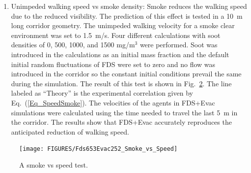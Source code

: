 \documentclass[12pt,a4paper,final,twoside]{stylevk}
\begin{document}
\begin{enumerate}
  geometry with no fire source and one agent in the middle of the room
  is used.  The agent is fixed at its initial position by setting the
  detection time large and by setting random noise of the movement
  equations to zero.  FDS point measurements of the gas concentrations
  and FED are placed at the position of the agent.  The room is
  initialized with different CO, CO${}_2$, and 0${}_2$ concentrations
  to test the overall FED calculation and each different component
  separately also.  The concentrations for the four different
  calculations were: (2, 0.1, 15)~\%, (0, 0, 12)~\% (0, 0.1, 21)~\%,
  and (3.43, 0.1, 21)~\% for the (CO${}_2$, CO, O${}_2$) volume
  fractions.  The room stays at the specified initial conditions,
  because there is nothing to generate a flow and also the initial
  random noise of FDS flow calculation is switched off.  The FDS+Evac
  output for the FED index of the agent is compared to a value
  computed using an external worksheet and the FDS point measurements
  for gas concentrations and for the FED index.  The results of the
  comparison are shown in Fig.~\ref{Fig_FED_Test}.  The results
  indicate that the FED calculation in FDS+Evac is implemented
  correctly (and that the ``FED'' point measurement output is also
  implemented correctly).
%
\begin{figure}[!tb]
  \centerline{\texttt{[image: FIGURES/Test\_Fds653Evac252\_FED]}} 
  \caption{A FED test.}\label{Fig_FED_Test}
\end{figure}
%
\item Unimpeded walking speed vs smoke density: Smoke reduces the
  walking speed due to the reduced visibility.  The prediction of this
  effect is tested in a 10~m long corridor geometry.  The unimpeded
  walking velocity for a smoke clear environment was set to 1.5~m/s.
  Four different calculations with soot densities of 0, 500, 1000, and
  1500 mg/m${}^\textrm{3}$ were performed.  Soot was introduced in the
  calculations as an initial mass fraction and the default initial
  random fluctuations of FDS were set to zero and no flow was
  introduced in the corridor so the constant initial conditions
  prevail the same during the simulation.  The result of this test is
  shown in Fig.~\ref{Fig_SmokeSpeedTest}.  The line labeled as
  ``Theory'' is the experimental correlation given by
  Eq.~(\ref{Eq_SpeedSmoke}).  The velocities of the agents in FDS+Evac
  simulations were calculated using the time needed to travel the last
  5~m in the corridor.  The results show that FDS+Evac accurately
  reproduces the anticipated reduction of walking speed.
%
\end{enumerate}
%
%
\begin{figure}[!tb]
  \centerline{\texttt{[image: FIGURES/Fds653Evac252\_Smoke\_vs\_Speed]}}   
  \caption{A smoke vs speed test.}\label{Fig_SmokeSpeedTest}
\end{figure}
%
\end{document}
